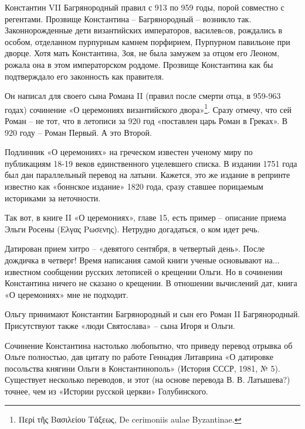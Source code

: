 Константин VII Багрянородный правил с 913 по 959 годы, порой совместно с регентами. Прозвище Константина – Багрянородный – возникло так. Законнорожденные дети византийских императоров, василевcов, рождались в особом, отделанном пурпурным камнем порфирием, Пурпурном павильоне при дворце. Хотя мать Константина, Зоя, не была замужем за отцом его Леоном, рожала она в этом императорском роддоме. Прозвище Константина как бы подтверждало его законность как правителя.

Он написал для своего сына Романа II (правил после смерти отца, в 959-963 годах) сочинение «О церемониях византийского двора»\footnote{Περί τῆς Βασιλείου Τάξεως, De cerimoniis aulae Byzantinae.}. Сразу отмечу, что сей Роман – не тот, что в летописи за 920 год «поставлен царь Роман в Греках». В 920 году – Роман Первый. А это Второй.

Подлинник «О церемониях» на греческом известен ученому миру по публикациям 18-19 веков единственного уцелевшего списка. В издании 1751 года был дан параллельный перевод на латыни. Кажется, это же издание в репринте известно как «боннское издание» 1820 года, сразу ставшее порицаемым историками за неточности.

Так вот, в книге II «О церемониях», главе 15, есть пример – описание приема Эльги Росены (Ελγας Ρωσενης). Нетрудно догадаться, о ком идет речь.

Датирован прием хитро – «девятого сентября, в четвертый день». После дождичка в четверг! Время написания самой книги ученые основывают на... известном сообщении русских летописей о крещении Ольги. Но в сочинении Константина ничего не сказано о крещении. В отношении вычислений дат, книга «О церемониях» мне не подходит.%

Ольгу принимают Константин Багрянородный и сын его Роман II Багрянородный. Присутствуют также «люди Святослава» – сына Игоря и Ольги. %

Сочинение Константина настолько любопытно, что приведу перевод отрывка об Ольге полностью, дав цитату по работе Геннадия Литаврина «О датировке посольства княгини Ольги в Константинополь» (История СССР, 1981, № 5). Существует несколько переводов, и этот (на основе перевода В. В. Латышева?) точнее, чем из «Истории русской церкви» Голубинского.

